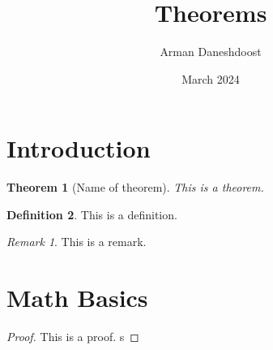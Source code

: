 \documentclass{article}
\title{Theorems}
\author{Arman Daneshdoost}
\date{March 2024}
\theoremstyle{plain} %
\newtheorem{theorem}{Theorem}[section] %
\theoremstyle{definition}
\newtheorem{definition}[theorem]{Definition} %
\theoremstyle{remark}
\newtheorem*{remark}{Remark}
\begin{document}
	\maketitle
	
	\section{Introduction}
	\begin{theorem}[Name of theorem]
		This is a theorem.
	\end{theorem}
	\begin{definition}
		This is a definition.
	\end{definition}
	\begin{remark}
		This is a remark.
	\end{remark}
	\section{Math Basics}
	\begin{proof}
		This is a proof. s
	\end{proof}
\end{document}
